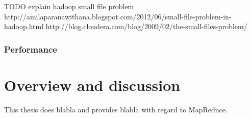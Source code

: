 \documentclass [12pt,a4paper]{report}
\begin{document}
TODO explain hadoop small file problem
http://amilaparanawithana.blogspot.com/2012/06/small-file-problem-in-hadoop.html
http://blog.cloudera.com/blog/2009/02/the-small-files-problem/

\subsection{Performance}

\chapter{Overview and discussion}

This thesis does blabla and provides blabla with regard to MapReduce. 

\clearpage
{}


\end{document}
